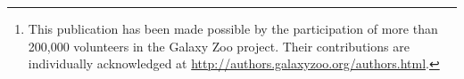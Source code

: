 \documentclass[twocolumn]{aastex6}
\begin{document}


\begin{abstract}

This is the data release paper for GZ:Hubble\footnote{This publication has been made possible by the participation of more than 200,000 volunteers in the Galaxy Zoo project. Their contributions are individually acknowledged at \url{http://authors.galaxyzoo.org/authors.html}.}. We present the classifications, the methodology for data reduction and corrections for redshift dependent biases in the observed morphologies. 

\end{abstract}
\end{document}

